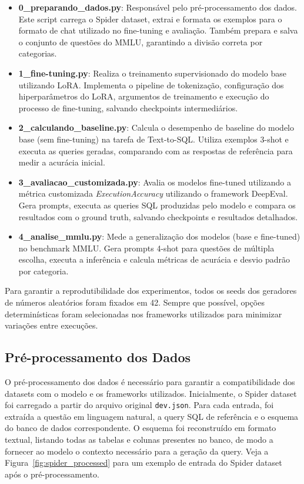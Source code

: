 \documentclass[journal,onecolumn]{IEEEtran}
\begin{document}
\begin{itemize}
    \item \textbf{0\_preparando\_dados.py}: Responsável pelo pré-processamento dos dados. Este script carrega o Spider dataset, extrai e formata os exemplos para o formato de chat utilizado no fine-tuning e avaliação. Também prepara e salva o conjunto de questões do MMLU, garantindo a divisão correta por categorias.

    \item \textbf{1\_fine-tuning.py}: Realiza o treinamento supervisionado do modelo base utilizando LoRA. Implementa o pipeline de tokenização, configuração dos hiperparâmetros do LoRA, argumentos de treinamento e execução do processo de fine-tuning, salvando checkpoints intermediários.

    \item \textbf{2\_calculando\_baseline.py}: Calcula o desempenho de baseline do modelo base (sem fine-tuning) na tarefa de Text-to-SQL. Utiliza exemplos 3-shot e executa as queries geradas, comparando com as respostas de referência para medir a acurácia inicial.

    \item \textbf{3\_avaliacao\_customizada.py}: Avalia os modelos fine-tuned utilizando a métrica customizada \textit{ExecutionAccuracy} utilizando o framework DeepEval. Gera prompts, executa as queries SQL produzidas pelo modelo e compara os resultados com o ground truth, salvando checkpoints e resultados detalhados.

    \item \textbf{4\_analise\_mmlu.py}: Mede a generalização dos modelos (base e fine-tuned) no benchmark MMLU. Gera prompts 4-shot para questões de múltipla escolha, executa a inferência e calcula métricas de acurácia e desvio padrão por categoria.
\end{itemize}

Para garantir a reprodutibilidade dos experimentos, todos os seeds dos geradores de números aleatórios foram fixados em 42. Sempre que possível, opções determinísticas foram selecionadas nos frameworks utilizados para minimizar variações entre execuções.

\subsection{Pré-processamento dos Dados}
O pré-processamento dos dados é necessário para garantir a compatibilidade dos datasets com o modelo e os frameworks utilizados. Inicialmente, o Spider dataset foi carregado a partir do arquivo original \texttt{dev.json}. Para cada entrada, foi extraída a questão em linguagem natural, a query SQL de referência e o esquema do banco de dados correspondente. O esquema foi reconstruído em formato textual, listando todas as tabelas e colunas presentes no banco, de modo a fornecer ao modelo o contexto necessário para a geração da query. Veja a Figura~\ref{fig:spider_processed} para um exemplo de entrada do Spider dataset após o pré-processamento.
\end{document}
